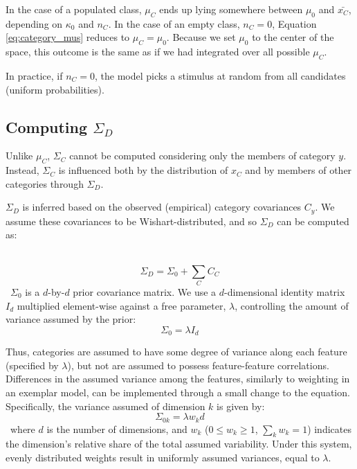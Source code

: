 \documentclass[12pt]{article}
\begin{document}
In the case of a populated class, $\mu_{C}$ ends up lying somewhere between $\mu_{0}$ and $\bar{x_C}$, depending on $\kappa_{0}$ and $n_C$. In the case of an empty class, $n_C = 0$, Equation \ref{eq:category_mus} reduces to $\mu_{C} = \mu_{0}$. Because we set $\mu_0$ to the center of the space, this outcome is the same as if we had integrated over all possible $\mu_C$. 

In practice, if $n_C = 0$, the model picks a stimulus at random from all candidates (uniform probabilities). 

\subsection*{Computing $\Sigma_D$}

Unlike $\mu_C$, $\Sigma_C$ cannot be computed considering only the members of category $y$. Instead, $\Sigma_C$ is influenced both by the distribution of $x_C$ and by members of other categories through $\Sigma_D$.

$\Sigma_D$ is inferred based on the observed (empirical) category covariances $C_y$. We assume these covariances to be Wishart-distributed, and so $\Sigma_D$ can be computed as:

\
\begin{equation}
    \Sigma_D = \Sigma_0 + \sum_{C}{C_C}
\end{equation}
\
$\Sigma_{0}$ is a $d$-by-$d$ prior covariance matrix. We use a $d$-dimensional identity matrix $I_d$ multiplied element-wise against a free parameter, $\lambda$, controlling the amount of variance assumed by the prior:
\
\begin{equation}
    \Sigma_0 =  \lambda I_d
\end{equation}

Thus, categories are assumed to have some degree of variance along each feature (specified by $\lambda$), but not are assumed to possess feature-feature correlations. Differences in the assumed variance among the features, similarly to weighting in an exemplar model, can be implemented through a small change to the equation. Specifically, the variance assumed of dimension $k$ is given by:
\
\begin{equation}
    \Sigma_{0k} =  \lambda w_k d
\end{equation}
\
where $d$ is the number of dimensions, and $w_k$ ($0 \leq w_k \geq 1$, $\sum_k{w_k} = 1$) indicates the dimension's relative share of the total assumed variability. Under this system, evenly distributed weights result in uniformly assumed variances, equal to $\lambda$.
\end{document}
